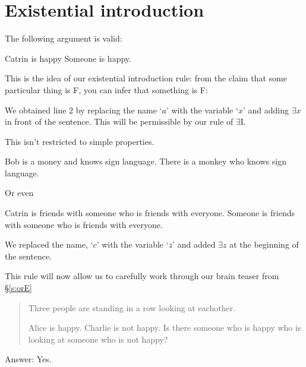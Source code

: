 \section{Existential introduction}
The following argument is valid:
\begin{earg}
\prem Catrin is happy
\conc Someone is happy.
\end{earg}

This is the idea of our existential introduction rule: from the claim that some particular thing is F, you can infer that something is F:
\begin{fitchproof}
	 
\end{fitchproof}
We obtained line 2 by replacing the name `$a$' with the variable `$x$' and adding $\exists x$ in front of the sentence. This will be permissible by our rule of $\exists$I.

This isn't restricted to simple properties.
\begin{earg}
\prem Bob is a money and knows sign language.
\conc There is a monkey who knows sign language.
\end{earg}
\begin{fitchproof}
	 
\end{fitchproof}

Or even
\begin{earg}
\prem Catrin is friends with someone who is friends with everyone.
\conc Someone is friends with someone who is friends with everyone.
\end{earg}
\begin{fitchproof}
	 
\end{fitchproof}We replaced the name, `$c$' with the variable `$z$' and added $\exists z$ at the beginning of the sentence.


This rule will now allow us to carefully work through our brain teaser from \S\ref{s:orE}
\label{s:ExistsE}

\begin{quote}
Three people are standing in a row looking at eachother.
\begin{center}
\end{center}
Alice is happy. Charlie is not happy. Is there someone who is happy who is looking at someone who is not happy?
\end{quote}  Answer: Yes.


